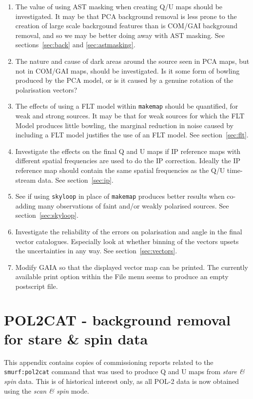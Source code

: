 \documentclass[twoside,11pt]{starlink}
\begin{document}
\begin{enumerate}
\item The value of using AST masking when creating Q/U maps should be
investigated. It may be that PCA background removal is less prone to
the creation of large scale backrgound features than is COM/GAI
background removal, and so we may be better doing away with AST masking.
See sections~\ref{sec:back} and \ref{sec:astmasking}.

\item The nature and cause of dark areas around the source seen in PCA
maps, but not in COM/GAI maps, should be investigated. Is it some form of
bowling produced by the PCA model, or is it caused by a genuine rotation
of the polarisation vectors?

\item The effects of using a FLT model within \texttt{makemap} should be
quantified, for weak and strong sources. It may be that for weak sources
for which the FLT Model produces little bowling, the marginal reduction
in noise caused by including a FLT model justifies the use of an FLT model.
See section~\ref{sec:flt}.

\item Investigate the effects on the final Q and U maps if IP reference
maps with different spatial frequencies are used to do the IP correction.
Ideally the IP reference map should contain the same spatial frequencies
as the Q/U time-stream data. See section~\ref{sec:ip}.

\item See if using \texttt{skyloop} in place of \texttt{makemap} produces
better results when co-adding many observations of faint and/or weakly
polarised sources.  See section~\ref{sec:skyloop}.

\item Investigate the reliability of the errors on polarisation and angle
in the final vector catalogues. Especially look at whether binning of the
vectors upsets the uncertainties in any way. See section~\ref{sec:vectors}.

\item Modify GAIA so that the displayed vector map can be printed. The
currently available print option within the File menu seems to produce an
empty postscript file.
\end{enumerate}

\appendix

\section{POL2CAT - background removal for stare \& spin data}
\label{app:stare}
This appendix contains copies of commissioning reports related to the
\texttt{smurf:pol2cat} command that was used to produce Q and U maps from
\emph{stare \& spin} data. This is of historical interest only, as all POL-2
data is now obtained using the \emph{scan \& spin} mode.
\end{document}
